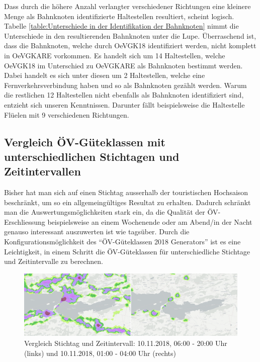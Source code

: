 Dass durch die höhere Anzahl verlangter verschiedener Richtungen eine kleinere Menge als Bahnknoten identifizierte Haltestellen resultiert, scheint logisch.
Tabelle \ref{table:Unterschiede in der Identifikation der Bahnknoten} nimmt die Unterschiede in den resultierenden Bahnknoten unter die Lupe.
Überraschend ist, dass die Bahnknoten, welche durch OeVGK18 identifiziert werden, nicht komplett in OeVGKARE vorkommen.
Es handelt sich um 14 Haltestellen, welche OeVGK18 im Unterschied zu OeVGKARE als Bahnknoten bestimmt werden.
Dabei handelt es sich unter diesen um 2 Haltestellen, welche eine Fernverkehrsverbindung haben und so als Bahnknoten gezählt werden.
Warum die restlichen 12 Haltestellen nicht ebenfalls als Bahnknoten identifiziert sind, entzieht sich unseren Kenntnissen.
Darunter fällt beispielsweise die Haltestelle Flüelen mit 9 verschiedenen Richtungen.

\subsection{Vergleich ÖV-Güteklassen mit unterschiedlichen Stichtagen und Zeitintervallen}
\label{Resultate:Vergleich ÖV-Güteklassen mit unterschiedlichen Stichtagen und Zeitintervallen}

Bisher hat man sich auf einen Stichtag ausserhalb der touristischen Hochsaison beschränkt, um so ein allgemeingültiges Resultat zu erhalten.
Dadurch schränkt man die Auswertungsmöglichkeiten stark ein, da die Qualität der \acs{ÖV}-Erschliessung beispielsweise an einem Wochenende oder am Abend/in der Nacht genauso interessant auszuwerten ist wie tagsüber.
Durch die Konfigurationsmöglichkeit des "`\acs{ÖV}-Güteklassen 2018 Generators"' ist es eine Leichtigkeit, in einem Schritt die \acs{ÖV}-Güteklassen für unterschiedliche Stichtage und Zeitintervalle zu berechnen.

\begin{figure}[ht]
    \centering
    \includegraphics[width=1.0\linewidth]{technicalreport/img/due_date_comparison.png}
    \caption[Vergleich Stichtag und Zeitintervall]{Vergleich Stichtag und Zeitintervall: 10.11.2018, 06:00 - 20:00 Uhr (links) und 10.11.2018, 01:00 - 04:00 Uhr (rechts)}
    \label{fig:due_date_comparison}
\end{figure}

